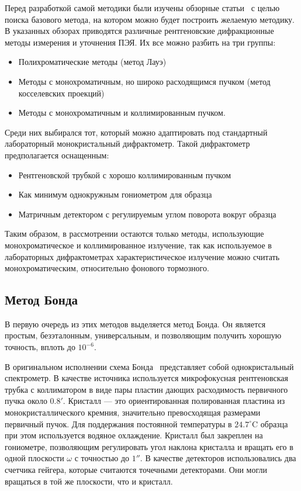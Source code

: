 \documentclass[a4paper,14pt]{extarticle}
\newcommand{\celcius}{^\circ \text{C}}
\newcounter{x}
\begin{document}
Перед разработкой самой методики были изучены обзорные статьи~\cite{Lider:2020,Galdecka:2006} с целью поиска базового метода, на котором можно будет построить желаемую методику.
В указанных обзорах приводятся различные рентгеновские дифракционные методы измерения и уточнения ПЭЯ.
Их все можно разбить на три группы:
\begin{itemize}
    \item Полихроматические методы (метод Лауэ)
    \item Методы с монохроматичным, но широко расходящимся пучком (метод косселевских проекций)
    \item Методы с монохроматичным и коллимированным пучком.
\end{itemize}
Среди них выбирался тот, который можно адаптировать под стандартный лабораторный монокристальный дифрактометр.
Такой дифрактометр предполагается оснащенным:
\begin{itemize}
    \item Рентгеновской трубкой с хорошо коллимированным пучком
    \item Как минимум однокружным гониометром для образца
    \item Матричным детектором с регулируемым углом поворота вокруг образца
\end{itemize}
Таким образом, в рассмотрении остаются только методы, использующие монохроматическое и коллимированное излучение, так как используемое в лабораторных дифрактометрах характеристическое излучение можно считать монохроматическим, относительно фонового тормозного.

\subsection{Метод Бонда}

В первую очередь из этих методов выделяется метод Бонда.
Он является простым, безэталонным, универсальным, и позволяющим получить хорошую точность, вплоть до $10^{-6}$.

В оригинальном исполнении схема Бонда~\cite{Bond:1960} представляет собой однокристальный спектрометр.
В качестве источника используется микрофокусная рентгеновская трубка с коллиматором в виде пары пластин дающих расходимость первичного пучка около $0.8'$.
Кристалл --- это ориентированная полированная пластина из монокристаллического кремния, значительно превосходящая размерами первичный пучок.
Для поддержания постоянной температуры в $24.7\celcius$ образца при этом используется водяное охлаждение.
Кристалл был закреплен на гониометре, позволяющим регулировать угол наклона кристалла и вращать его в одной плоскости $\omega$ с точностью до $1''$.
В качестве детекторов использовались два счетчика гейгера, которые считаются точечными детекторами.
Они могли вращаться в той же плоскости, что и кристалл.
\end{document}
